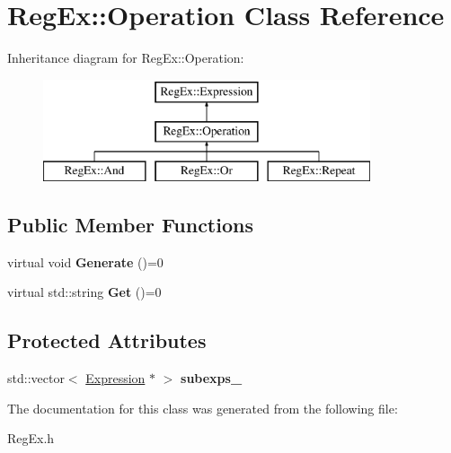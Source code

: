 \hypertarget{class_reg_ex_1_1_operation}{}\section{Reg\+Ex\+:\+:Operation Class Reference}
\label{class_reg_ex_1_1_operation}
Inheritance diagram for Reg\+Ex\+:\+:Operation\+:\begin{figure}[H]
\begin{center}
\leavevmode
\includegraphics[height=3.000000cm]{class_reg_ex_1_1_operation}
\end{center}
\end{figure}
\subsection*{Public Member Functions}
\begin{DoxyCompactItemize}
\item 
\mbox{\label{class_reg_ex_1_1_operation_af8c49dedc8e289586f38b6c4f5c544d2}} 
virtual void {\bfseries Generate} ()=0
\item 
\mbox{\label{class_reg_ex_1_1_operation_aca61b02ac8e2bd4bdcb9c13e62b7fe85}} 
virtual std\+::string {\bfseries Get} ()=0
\end{DoxyCompactItemize}
\subsection*{Protected Attributes}
\begin{DoxyCompactItemize}
\item 
\mbox{\label{class_reg_ex_1_1_operation_a2c58edc54d112abfba6b822a3f383890}} 
std\+::vector$<$ \hyperlink{class_reg_ex_1_1_expression}{Expression} $\ast$ $>$ {\bfseries subexps\+\_\+}
\end{DoxyCompactItemize}


The documentation for this class was generated from the following file\+:\begin{DoxyCompactItemize}
\item 
Reg\+Ex.\+h\end{DoxyCompactItemize}
